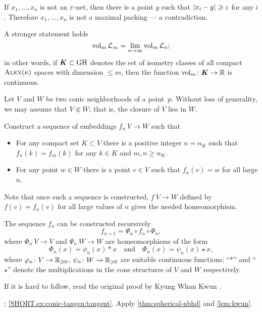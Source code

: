  If $x_1,\dots,x_n$ is not an $\varepsilon$-net, then there is a point $y$ such that $\dist{x_i}{y}{}\ge\eps$ for any $i$.
Therefore $x_1,\dots,x_n$ is not a maximal packing --- a contradiction.


A stronger statement holds 
\[\operatorname{\rm vol}\nolimits_m\mathcal{L}_\infty=\lim_{n\to\infty} \operatorname{\rm vol}\nolimits_m\mathcal{L}_n;\]
in other words, if $\bm{K}\subset \operatorname{\rm GH}\nolimits$ denotes the set of isometry classes of all compact $\textsc{Alex}(\kappa)$ spaces with dimension $\le m$, then the function
$\operatorname{\rm vol}\nolimits_m\colon\bm{K}\to \mathbb{R}$ is continuous.




Let $V$ and $W$ be two conic neighborhoods of a point~$p$.
Without loss of generality, we may assume that $V\Subset W$;
that is, the closure of $V$ lies in $W$.

Construct a sequence of embeddings $f_n\:V\to W$
such that 
\begin{itemize}
\item 
For any compact set $K\subset V$ 
there is a positive integer $n=n_K$ such that 
$f_n(k)=f_m(k)$ for any $k\in K$ and $m, n \ge n_K$.
\item For any point $w\in W$ there is a point $v\in V$ such that $f_n(v)=w$ for all large $n$.
\end{itemize}

Note that once such a sequence is constructed, $f\:V\to W$ defined by $f(v)=f_n(v)$ for all large values of $n$ gives the needed homeomorphism.

The sequence $f_n$ can be constructed recursively
\[f_{n+1}=\Psi_n\circ f_n\circ \Phi_n,\]
where $\Phi_n\:V\to V$ 
and $\Psi_n\:W\to W$ 
are homeomorphisms
of the form 
\[\Phi_n(x)=\phi_n(x)\ast x\quad \text{and}\quad \Phi_n(x)=\psi_n(x)\star x,\]
where $\varphi_n\colon V\to \mathbb{R}_{\geqslant 0}$, $\psi_n\colon W\to \mathbb{R}_{\geqslant 0}$ are suitable continuous functions;
``$\ast$'' and ``$\star$'' denote the multiplications in the cone structures of $V$ and $W$ respectively.

 If it is hard to follow, read the original proof by Kyung Whan Kwun \cite{kwun1964}.

\parbf{\ref{ex:conic-tangent}}; \ref{SHORT.ex:conic-tangen:tangent}. Apply \ref{thm:spherical-nbhd} and \ref{lem:kwun}.

